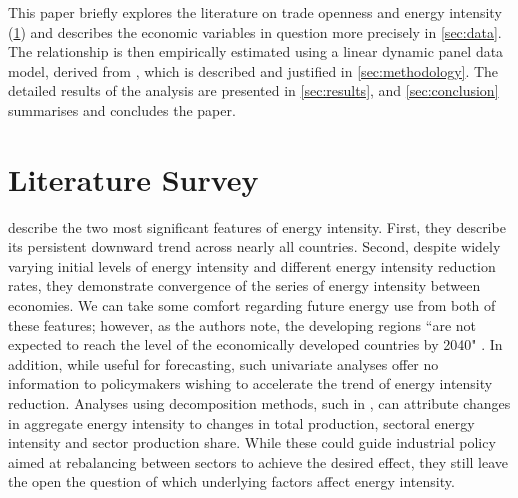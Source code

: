 \documentclass[12pt,a4paper]{article}
\begin{document}
This paper briefly explores the literature on trade openness and energy intensity (\cref{sec:literature}) and describes the economic variables in question more precisely in \cref{sec:data}.
The relationship is then empirically estimated using a linear dynamic panel data model, derived from \cite{arellanoTestsSpecificationPanel1991}, which is described and justified in \cref{sec:methodology}.
The detailed results of the analysis are presented in \cref{sec:results}, and \cref{sec:conclusion} summarises and concludes the paper.

\section{Literature Survey}\label{sec:literature}

\cite{ederAnalysisEnergyIntensity2018} describe the two most significant features of energy intensity. First, they describe its persistent downward trend across nearly all countries.
Second, despite widely varying initial levels of energy intensity and different energy intensity reduction rates, they demonstrate convergence of the series of energy intensity between economies.
We can take some comfort regarding future energy use from both of these features; however, as the authors note, the developing regions ``are not expected to reach the level of the economically developed countries by 2040" \citep[p.1971]{ederAnalysisEnergyIntensity2018}.
In addition, while useful for forecasting, such univariate analyses offer no information to policymakers wishing to accelerate the trend of energy intensity reduction. 
Analyses using decomposition methods, such in \cite{liuEightMethodsDecomposing2003}, can attribute changes in aggregate energy intensity to changes in total production, sectoral energy intensity and sector production share. While these could guide industrial policy aimed at rebalancing between sectors to achieve the desired effect, they still leave the open the question of which underlying factors affect energy intensity.
\end{document}
